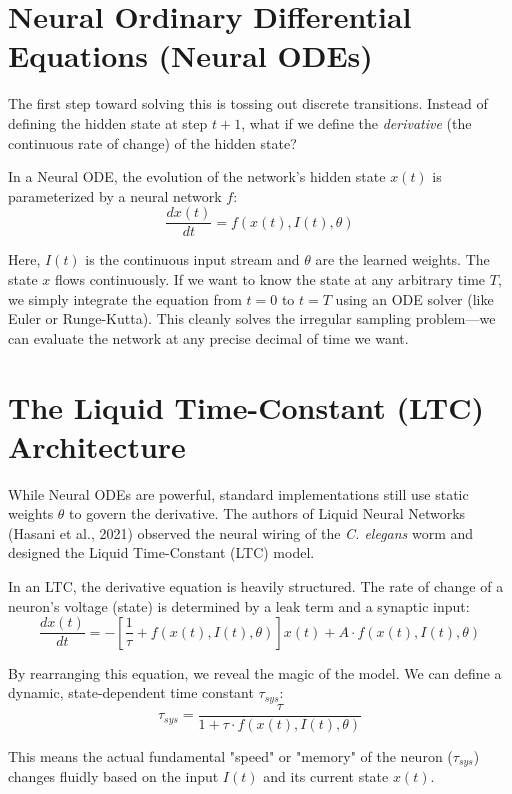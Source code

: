 \documentclass[12pt]{article}
\begin{document}
\section*{Neural Ordinary Differential Equations (Neural ODEs)}
The first step toward solving this is tossing out discrete transitions. Instead of defining the hidden state at step $t+1$, what if we define the \textit{derivative} (the continuous rate of change) of the hidden state?

In a Neural ODE, the evolution of the network's hidden state $x(t)$ is parameterized by a neural network $f$:
\begin{equation}
\frac{dx(t)}{dt} = f(x(t), I(t), \theta)
\end{equation}

Here, $I(t)$ is the continuous input stream and $\theta$ are the learned weights. The state $x$ flows continuously. If we want to know the state at any arbitrary time $T$, we simply integrate the equation from $t=0$ to $t=T$ using an ODE solver (like Euler or Runge-Kutta). This cleanly solves the irregular sampling problem—we can evaluate the network at any precise decimal of time we want. 

\section*{The Liquid Time-Constant (LTC) Architecture}
While Neural ODEs are powerful, standard implementations still use static weights $\theta$ to govern the derivative. The authors of Liquid Neural Networks (Hasani et al., 2021) observed the neural wiring of the \textit{C. elegans} worm and designed the Liquid Time-Constant (LTC) model. 

In an LTC, the derivative equation is heavily structured. The rate of change of a neuron's voltage (state) is determined by a leak term and a synaptic input:
\begin{equation}
\frac{dx(t)}{dt} = - \left[ \frac{1}{\tau} + f(x(t), I(t), \theta) \right] x(t) + A \cdot f(x(t), I(t), \theta)
\end{equation}

By rearranging this equation, we reveal the magic of the model. We can define a dynamic, state-dependent time constant $\tau_{sys}$:
\begin{equation}
\tau_{sys} = \frac{\tau}{1 + \tau \cdot f(x(t), I(t), \theta)}
\end{equation}

This means the actual fundamental "speed" or "memory" of the neuron ($\tau_{sys}$) changes fluidly based on the input $I(t)$ and its current state $x(t)$. 
\end{document}
